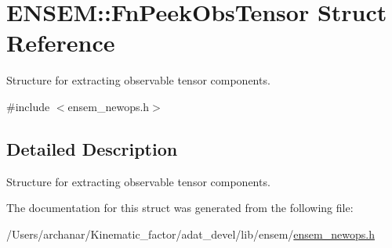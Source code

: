 \hypertarget{structENSEM_1_1FnPeekObsTensor}{}\section{E\+N\+S\+EM\+:\+:Fn\+Peek\+Obs\+Tensor Struct Reference}
\label{structENSEM_1_1FnPeekObsTensor}


Structure for extracting observable tensor components.  




{\ttfamily \#include $<$ensem\+\_\+newops.\+h$>$}



\subsection{Detailed Description}
Structure for extracting observable tensor components. 

The documentation for this struct was generated from the following file\+:\begin{DoxyCompactItemize}
\item 
/\+Users/archanar/\+Kinematic\+\_\+factor/adat\+\_\+devel/lib/ensem/\mbox{\hyperlink{lib_2ensem_2ensem__newops_8h}{ensem\+\_\+newops.\+h}}\end{DoxyCompactItemize}
